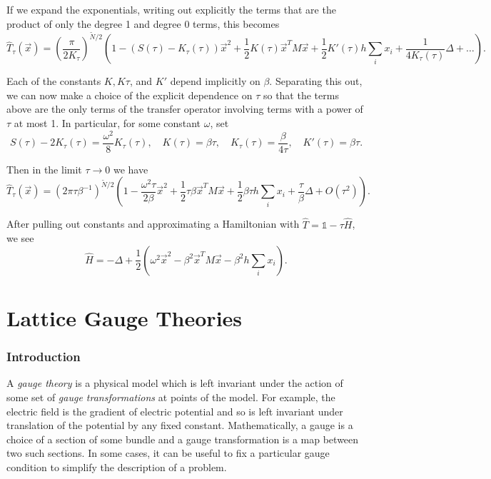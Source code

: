 \documentclass[10pt,reqno]{amsart}
\numberwithin{equation}{section}
\begin{document}
	If we expand the exponentials, writing out explicitly the terms that are the product of only the degree 1 and degree 0 terms, this becomes
	\begin{equation}
		\hat{T}_\tau(\vec{x}) = \left(\frac{\pi}{2K_\tau} \right)^{\widetilde{N}/2} \left( 1 -(S(\tau)-K_\tau(\tau))\vec{x}^2+\frac{1}{2}K(\tau)\vec{x}^T M \vec{x} + \frac{1}{2} K'(\tau)h\sum_{i} x_i + \frac{1}{4K_\tau(\tau)}\Delta + \ldots \right).
	\end{equation}
	
	Each of the constants $K, K\tau$, and $K'$ depend implicitly on $\beta$. 
	Separating this out, we can now make a choice of the explicit dependence on $\tau$ so that the terms above are the only terms of the transfer operator involving terms with a power of $\tau$ at most 1.
	In particular, for some constant $\omega$, set
	\begin{equation}
		S(\tau)-2K_\tau(\tau)=\frac{\omega^2}{8}K_\tau(\tau), \quad K(\tau)=\beta \tau, \quad K_\tau(\tau)=\frac{\beta}{4\tau}, \quad K'(\tau)=\beta\tau.
	\end{equation}
	
	Then in the limit $\tau \to 0$ we have 
	\begin{equation}
		\hat{T}_\tau(\vec{x})=(2\pi \tau \beta^{-1})^{\widetilde{N}/2} \left( 1-\frac{\omega^2\tau}{2\beta}\vec{x}^2+\frac{1}{2}\tau\beta \vec{x}^T M \vec{x} +\frac{1}{2}\beta\tau h \sum_i x_i +\frac{\tau}{\beta} \Delta + O(\tau^2) \right).
	\end{equation}
	
	After pulling out constants and approximating a Hamiltonian with $\hat{T}=\mathds{1}-\tau\hat{H}$, we see
	\begin{equation}
		\hat{H} = -\Delta+ \frac{1}{2}(\omega^2\vec{x}^2-\beta^2 \vec{x}^TM\vec{x}-\beta^2 h \sum_i x_i).
	\end{equation}
	
		\part{Lattice Gauge Theories}
	\section{Introduction}
	
	A \emph{gauge theory} is a physical model which is left invariant under the action of some set of \emph{gauge transformations} at points of the model.
	For example, the electric field is the gradient of electric potential and so is left invariant under translation of the potential by any fixed constant.
	Mathematically, a gauge is a choice of a section of some bundle and a gauge transformation is a map between two such sections.
	In some cases, it can be useful to fix a particular gauge condition to simplify the description of a problem.	
			
\end{document}
